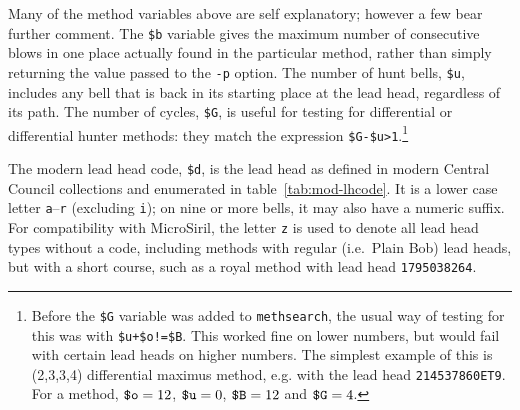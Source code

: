 \documentclass[a4paper,11pt,oneside]{book}
\makeatletter
\newcommand{\fspec}[1]{\index{#1@{\hspace*{-\fspecwidth}\texttt{\$#1}}}}
\def\methsearch{\texttt{meth\-search}}
\makeatother
\begin{document}
Many of the method variables above are self explanatory; however a few
bear further comment.  The \verb+$b+\fspec{b} variable gives the maximum
number of consecutive blows in one place actually found in the
particular method, rather than simply returning the value passed to the
\verb+-p+ option.  The number of hunt bells, \verb+$u+\fspec{u},
includes any bell that is back in its starting place at the lead head,
regardless of its path.
The number of cycles, \verb+$G+\fspec{G}, is useful for testing for
differential or differential hunter methods: they
match the expression \verb+$G-$u>1+.\footnote{Before the \verb+$G+
variable was added to \methsearch, the usual way of testing for this was
with \verb/$u+$o!=$B/. This worked fine on lower numbers, but would
fail with certain lead heads on higher numbers.  The simplest example of
this is (2,3,3,4) differential maximus method, e.g. with the lead head
\verb+214537860ET9+.  For a method, $\hbox{\verb+$o+}=12$,
$\hbox{\verb+$u+}=0$, $\hbox{\verb+$B+}=12$ and $\hbox{\verb+$G+}=4$.}

The modern lead head code, \verb+$d+\fspec{d}, is the lead head as defined
in modern Central Council collections and enumerated in 
table~\ref{tab:mod-lhcode}.
It is a lower case letter \verb+a+--\verb+r+ (excluding \verb+i+); 
on nine or more bells, it may also have a numeric suffix.  For compatibility
with MicroSiril, the letter \verb+z+ is used
to denote all lead head types without a code, including methods with regular
(i.e.\ Plain Bob) lead heads, but with a short course, such as a royal
method with lead head \verb+1795038264+.
\end{document}
